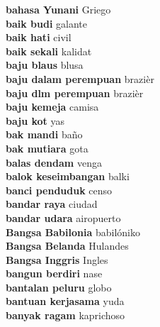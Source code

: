 \textbf{ bahasa Yunani  } Griego \\
\textbf{ baik budi  } galante \\
\textbf{ baik hati  } civil \\
\textbf{ baik sekali  } kalidat \\
\textbf{ baju blaus  } blusa \\
\textbf{ baju dalam perempuan  } brazièr \\
\textbf{ baju dlm perempuan  } brazièr \\
\textbf{ baju kemeja  } camisa \\
\textbf{ baju kot  } yas \\
\textbf{ bak mandi  } baño \\
\textbf{ bak mutiara  } gota \\
\textbf{ balas dendam  } venga \\
\textbf{ balok keseimbangan  } balki \\
\textbf{ banci penduduk  } censo \\
\textbf{ bandar raya  } ciudad \\
\textbf{ bandar udara  } airopuerto \\
\textbf{ Bangsa Babilonia  } babilóniko \\
\textbf{ Bangsa Belanda  } Hulandes \\
\textbf{ Bangsa Inggris  } Ingles \\
\textbf{ bangun berdiri  } nase \\
\textbf{ bantalan peluru  } globo \\
\textbf{ bantuan kerjasama  } yuda \\
\textbf{ banyak ragam  } kaprichoso \\
